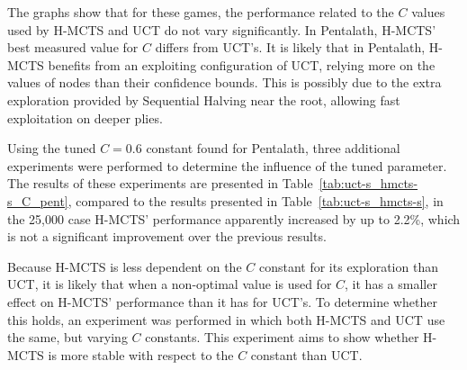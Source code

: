 \documentclass{kecsmstr}
\begin{document}
The graphs show that for these games, the performance related to the $C$ values used by H-MCTS and UCT do not vary significantly. In Pentalath, H-MCTS' best measured value for $C$ differs from UCT's. It is likely that in Pentalath, H-MCTS benefits from an exploiting configuration of UCT, relying more on the values of nodes than their confidence bounds. This is possibly due to the extra exploration provided by Sequential Halving near the root, allowing fast exploitation on deeper plies.

Using the tuned $C=0.6$ constant found for Pentalath, three additional experiments were performed to determine the influence of the tuned parameter. The results of these experiments are presented in Table~\ref{tab:uct-s_hmcts-s_C_pent}, compared to the results presented in Table~\ref{tab:uct-s_hmcts-s}, in the 25,000 case H-MCTS' performance apparently increased by up to 2.2\%, which is not a significant improvement over the previous results.

\begin{table}[hb]
\centering
\captionsetup{justification=centering}
\tabcolsep=0.3cm
\vspace{3mm}
{\caption[H-MCTS Solver vs. MCTS-Solver, tuned $C$]{H-MCTS Solver vs. MCTS-Solver, tuned $C$ for H-MCTS: $C=0.6$, and UCT: $C=0.8$.\\ Win percentages with respect to H-MCTS, 2,000 games.} \label{tab:uct-s_hmcts-s_C_pent}}
\end{table}



Because H-MCTS is less dependent on the $C$ constant for its exploration than UCT, it is likely that when a non-optimal value is used for $C$, it has a smaller effect on H-MCTS' performance than it has for UCT's. To determine whether this holds, an experiment was performed in which both H-MCTS and UCT use the same, but varying $C$ constants. This experiment aims to show whether H-MCTS is more stable with respect to the $C$ constant than UCT. 
\end{document}
